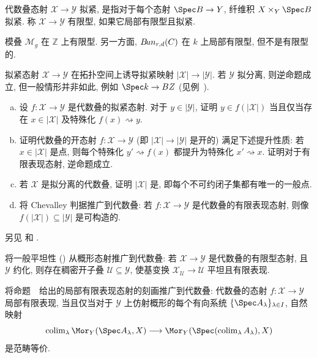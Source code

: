 \begin{definition}\label{src:4.3.28}
代数叠态射 $\mathcal X\to\mathcal Y$ 拟紧, 是指对于每个态射 $\Spec B\to\mathcal Y$, 纤维积 $\mathcal X\times_{\mathcal Y}\Spec B$ 拟紧. 称 $\mathcal X\to\mathcal Y$ 有限型, 如果它局部有限型且拟紧.
\end{definition}
\begin{example}\label{src:4.3.29}
模叠 $\mathcal M_g$ 在 $\mathbb Z$ 上有限型. 另一方面, $B\!un_{r,d}(C)$ 在 $k$ 上局部有限型, 但不是有限型的.
\end{example}
\begin{remark}\label{src:4.3.30}
拟紧态射 $\mathcal X\to\mathcal Y$ 在拓扑空间上诱导拟紧映射 $|\mathcal X|\to|\mathcal Y|$. 若 $\mathcal Y$ 拟分离, 则逆命题成立, 但一般情形并非如此, 例如 $\Spec k\to B\mathbb Z$ (见例~).
\end{remark}
\begin{exercise}[有挑战性]\label{src:4.3.31}
\begin{enumerate}[(a)]
\item 设 $f:\mathcal X\to\mathcal Y$ 是代数叠的拟紧态射. 对于 $y\in|\mathcal Y|$, 证明 $y\in f(|\mathcal X|)$ 当且仅当存在 $x\in|\mathcal X|$ 及特殊化 $f(x)\rightsquigarrow y$.
\item 证明代数叠的开态射 $f:\mathcal X\to\mathcal Y$ (即 $|\mathcal X|\to|\mathcal Y|$ 是开的) 满足下述提升性质: 若 $x\in|\mathcal X|$ 是点, 则每个特殊化 $y'\rightsquigarrow f(x)$ 都提升为特殊化 $x'\rightsquigarrow x$. 证明对于有限表现态射, 逆命题成立.
\item 若 $\mathcal X$ 是拟分离的代数叠, 证明 $|\mathcal X|$ 是, 即每个不可约闭子集都有唯一的一般点.
\item 将 Chevalley 判据推广到代数叠: 若 $f:\mathcal X\to\mathcal Y$ 是代数叠的有限表现态射, 则像 $f(|\mathcal X|)\subseteq|\mathcal Y|$ 是可构造的.
\end{enumerate}
另见 \cite[\S$5.7$--$5.9$]{LMB00} 和 \cite[Tags 0DQQ 和 0GVY]{SP}.
\end{exercise}
\begin{exercise}[一般平坦性]\label{src:4.3.32}
将一般平坦性 () 从概形态射推广到代数叠: 若 $\mathcal X\to\mathcal Y$ 是代数叠的有限型态射, 且 $\mathcal Y$ 约化, 则存在稠密开子叠 $\mathcal U\subseteq\mathcal Y$, 使基变换 $\mathcal X_{\mathcal U}\to\mathcal U$ 平坦且有限表现.
\end{exercise}
\begin{exercise}[技术性]\label{src:4.3.33}
将命题~~给出的局部有限表现态射的刻画推广到代数叠: 代数叠的态射 $f:\mathcal X\to\mathcal Y$ 局部有限表现, 当且仅当对于 $\mathcal Y$ 上仿射概形的每个有向系统 $\{\Spec A_\lambda\}_{\lambda\in I}$, 自然映射
\[
\operatorname{colim}_\lambda\Mor_{\mathcal Y}(\Spec A_\lambda,\mathcal X)
\longrightarrow\Mor_{\mathcal Y}(\Spec(\operatorname{colim}_\lambda A_\lambda),\mathcal X)
\]
是范畴等价.
\end{exercise}
